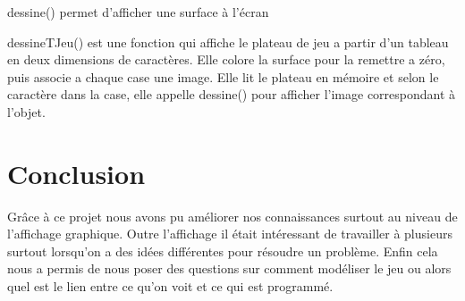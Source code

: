 \documentclass{article}
\begin{document}
dessine() permet d'afficher une surface à l'écran

dessineTJeu() est une fonction qui affiche le plateau de jeu a partir d'un tableau en deux dimensions de caractères.
Elle colore la surface pour la remettre a zéro, puis associe a chaque case une image.
Elle lit le plateau en mémoire et selon le caractère dans la case, elle appelle dessine() pour afficher l'image correspondant à l'objet.

\section*{Conclusion}
Grâce à ce projet nous avons pu améliorer nos connaissances surtout au niveau de l'affichage graphique.
Outre l'affichage il était intéressant de travailler à plusieurs surtout lorsqu'on a des idées différentes pour résoudre un problème.
Enfin cela nous a permis de nous poser des questions sur comment modéliser le jeu ou alors quel est le lien entre ce qu'on voit et ce qui est programmé. 
\end{document}
